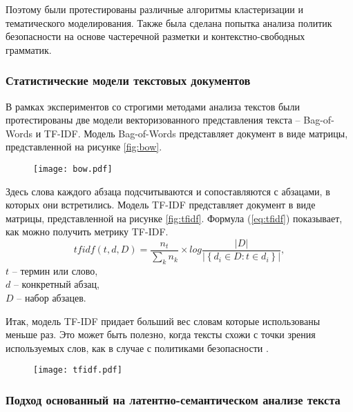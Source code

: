 \documentclass[../main]{subfiles}
\begin{document}
Поэтому были протестированы различные алгоритмы кластеризации и тематического моделирования. Также была сделана попытка анализа политик безопасности на основе частеречной разметки и контекстно-свободных грамматик.

\subsubsection{Статистические модели текстовых документов}

В рамках экспериментов со строгими методами анализа текстов были протестированы две модели векторизованного представления текста -- Bag-of-Words и TF-IDF. Модель Bag-of-Words представляет документ в виде матрицы, представленной на рисунке \ref{fig:bow}. 

\begin{figure}[H]
    \centering
    {\texttt{[image: bow.pdf]}}
    \vspace{-\baselineskip}
\end{figure}

Здесь слова каждого абзаца подсчитываются и сопоставляются с абзацами, в которых они встретились. Модель TF-IDF представляет документ в виде матрицы, представленной на рисунке \ref{fig:tfidf}. Формула (\ref{eq:tfidf}) показывает, как можно получить метрику TF-IDF.
\begin{equation}
    \label{eq:tfidf}
    tfidf(t, d, D) = \frac{n_t}{\displaystyle\sum_k n_k} \times 
    log \frac{ \big|{D}\big| }
    { \big|\left\{ d_i \in D : t \in d_i \right\}\big| },
\end{equation}
$t$ -- термин или слово,\\
\makebox[1.25cm]{}$d$ -- конкретный абзац,\\
\makebox[1.25cm]{}$D$ -- набор абзацев. 

Итак, модель TF-IDF придает больший вес словам которые использованы меньше раз. Это может быть полезно, когда тексты схожи с точки зрения используемых слов, как в случае с политиками безопасности \cite{LETI}.

\begin{figure}[H]
    \centering
    {\texttt{[image: tfidf.pdf]}}
    \vspace{-\baselineskip}
\end{figure}

\subsubsection{Подход основанный на латентно-семантическом анализе текста}
\end{document}
